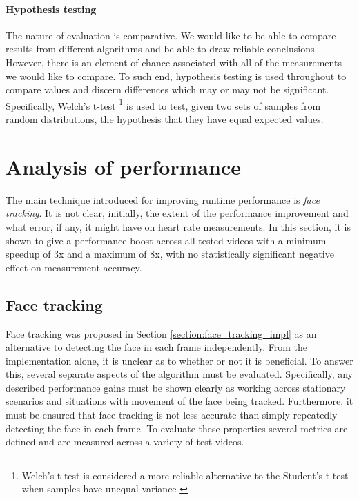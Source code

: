 


\paragraph{Hypothesis testing}
The nature of evaluation is comparative. We would like to be able to compare results from different algorithms and be able to draw reliable conclusions. However, there is an element of 
chance associated with all of the measurements we would like to compare.
To such end, hypothesis testing is used throughout to compare values and discern differences which may or may not be significant.
Specifically, Welch's t-test \cite{welch-t-test}\footnote{Welch's t-test is considered a more reliable alternative to the Student's t-test when samples have unequal variance \cite{superior-welch}}
is used to test, given two sets of samples from random distributions, the hypothesis that they have equal expected values. 


\section{Analysis of performance}
\label{section:face_tracking}
The main technique introduced for improving runtime performance is \textit{face tracking}. It is not clear, initially, the extent of the performance improvement and what error, if any, it might have 
on heart rate measurements. In this section, it is shown to give a performance boost across all tested videos with a minimum speedup of 3x and a maximum of 8x, with no statistically significant negative effect on measurement accuracy.

\subsection{Face tracking}
Face tracking was proposed in Section \ref{section:face_tracking_impl} as an alternative to detecting the face in each frame independently.
From the implementation alone, it is unclear as to whether or not it is beneficial. To answer this, several separate aspects of the algorithm must be evaluated. 
Specifically, any described performance gains must be shown clearly as working across stationary scenarios and situations with movement of the face being tracked. 
Furthermore, it must be ensured that face tracking is not less accurate than simply repeatedly detecting the face in each frame. 
To evaluate these properties several metrics are defined and are measured across a variety of test videos.
